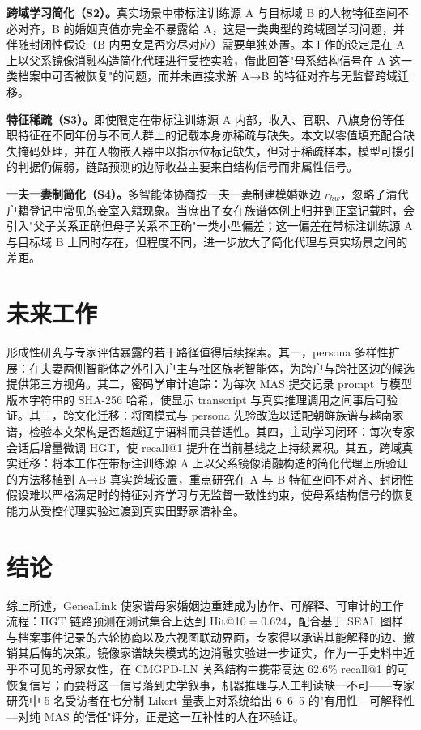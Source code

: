 \textbf{跨域学习简化（S2）。}真实场景中带标注训练源 A 与目标域 B 的人物特征空间不必对齐，B 的婚姻真值亦完全不暴露给 A，这是一类典型的跨域图学习问题，并伴随封闭性假设（B 内男女是否穷尽对应）需要单独处置。本工作的设定是在 A 上以父系镜像消融构造简化代理进行受控实验，借此回答"母系结构信号在 A 这一类档案中可否被恢复"的问题，而并未直接求解 A→B 的特征对齐与无监督跨域迁移。

\textbf{特征稀疏（S3）。}即使限定在带标注训练源 A 内部，收入、官职、八旗身份等任职特征在不同年份与不同人群上的记载本身亦稀疏与缺失。本文以零值填充配合缺失掩码处理，并在人物嵌入器中以指示位标记缺失，但对于稀疏样本，模型可援引的判据仍偏弱，链路预测的边际收益主要来自结构信号而非属性信号。

\textbf{一夫一妻制简化（S4）。}多智能体协商按一夫一妻制建模婚姻边 \(r_{hw}\)，忽略了清代户籍登记中常见的妾室入籍现象。当庶出子女在族谱体例上归并到正室记载时，会引入"父子关系正确但母子关系不正确"一类小型偏差；这一偏差在带标注训练源 A 与目标域 B 上同时存在，但程度不同，进一步放大了简化代理与真实场景之间的差距。

\section{未来工作}\label{sec:conclusion-future}

形成性研究与专家评估暴露的若干路径值得后续探索。其一，persona 多样性扩展：在夫妻两侧智能体之外引入户主与社区族老智能体，为跨户与跨社区边的候选提供第三方视角。其二，密码学审计追踪：为每次 MAS 提交记录 prompt 与模型版本字符串的 SHA-256 哈希，使显示 transcript 与真实推理调用之间事后可验证。其三，跨文化迁移：将图模式与 persona 先验改造以适配朝鲜族谱与越南家谱，检验本文架构是否超越辽宁语料而具普适性。其四，主动学习闭环：每次专家会话后增量微调 HGT，使 recall@1 提升在当前基线之上持续累积。其五，跨域真实迁移：将本工作在带标注训练源 A 上以父系镜像消融构造的简化代理上所验证的方法移植到 A→B 真实跨域设置，重点研究在 A 与 B 特征空间不对齐、封闭性假设难以严格满足时的特征对齐学习与无监督一致性约束，使母系结构信号的恢复能力从受控代理实验过渡到真实田野家谱补全。

\section{结论}\label{sec:conclusion-final}

综上所述，GeneaLink 使家谱母家婚姻边重建成为协作、可解释、可审计的工作流程：HGT 链路预测在测试集合上达到 Hit@10$=0.624$，配合基于 SEAL 图样与档案事件记录的六轮协商以及六视图联动界面，专家得以承诺其能解释的边、撤销其后悔的决策。镜像家谱缺失模式的边消融实验进一步证实，作为一手史料中近乎不可见的母家女性，在 CMGPD-LN 关系结构中携带高达 62.6\% recall@1 的可恢复信号；而要将这一信号落到史学叙事，机器推理与人工判读缺一不可——专家研究中 5 名受访者在七分制 Likert 量表上对系统给出 6--6--5 的"有用性—可解释性—对纯 MAS 的信任"评分，正是这一互补性的人在环验证。
